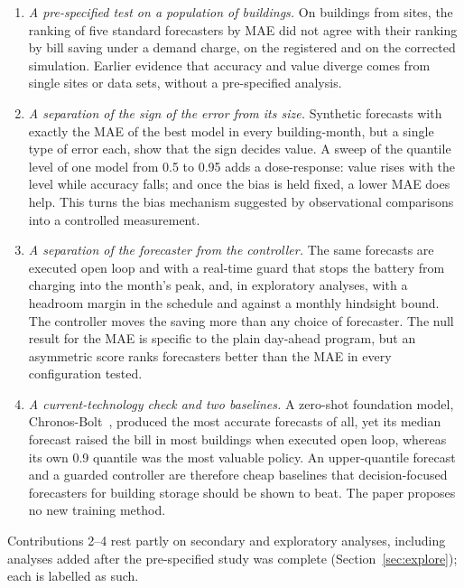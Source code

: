 \begin{enumerate}
\item \emph{A pre-specified test on a population of buildings.} On  buildings from  sites, the ranking of five standard forecasters by MAE did not agree with their ranking by bill saving under a demand charge, on the registered and on the corrected simulation. Earlier evidence that accuracy and value diverge comes from single sites or data sets, without a pre-specified analysis.
\item \emph{A separation of the sign of the error from its size.} Synthetic forecasts with exactly the MAE of the best model in every building-month, but a single type of error each, show that the sign decides value. A sweep of the quantile level of one model from 0.5 to 0.95 adds a dose-response: value rises with the level while accuracy falls; and once the bias is held fixed, a lower MAE does help. This turns the bias mechanism suggested by observational comparisons~\cite{katholnigg2025impact} into a controlled measurement.
\item \emph{A separation of the forecaster from the controller.} The same forecasts are executed open loop and with a real-time guard that stops the battery from charging into the month's peak, and, in exploratory analyses, with a headroom margin in the schedule and against a monthly hindsight bound. The controller moves the saving more than any choice of forecaster. The null result for the MAE is specific to the plain day-ahead program, but an asymmetric score ranks forecasters better than the MAE in every configuration tested.
\item \emph{A current-technology check and two baselines.} A zero-shot foundation model, Chronos-Bolt~\cite{ansari2024chronos}, produced the most accurate forecasts of all, yet its median forecast raised the bill in most buildings when executed open loop, whereas its own 0.9 quantile was the most valuable policy. An upper-quantile forecast and a guarded controller are therefore cheap baselines that decision-focused forecasters for building storage should be shown to beat. The paper proposes no new training method.
\end{enumerate}
Contributions 2--4 rest partly on secondary and exploratory analyses, including analyses added after the pre-specified study was complete (Section~\ref{sec:explore}); each is labelled as such.

